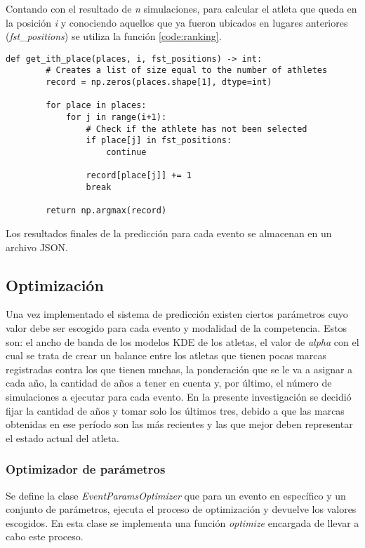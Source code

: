Contando con el resultado de \textit{n} simulaciones, para calcular el atleta que queda en la posición \textit{i} y conociendo aquellos que ya fueron ubicados en lugares anteriores (\textit{fst\_positions}) se utiliza la función \ref{code:ranking}.

\begin{lstlisting}[caption= Función encargada de obtener el atleta que ocupa la posición i del ranking final, label = code:ranking]
    def get_ith_place(places, i, fst_positions) -> int:
        # Creates a list of size equal to the number of athletes   
        record = np.zeros(places.shape[1], dtype=int)

        for place in places:        
            for j in range(i+1):
                # Check if the athlete has not been selected
                if place[j] in fst_positions:
                    continue
                
                record[place[j]] += 1
                break

        return np.argmax(record)
\end{lstlisting}

Los resultados finales de la predicción para cada evento se almacenan en un archivo JSON.

\subsection{Optimización}

Una vez implementado el sistema de predicción existen ciertos parámetros cuyo valor debe ser escogido para cada evento y modalidad de la competencia. Estos son: el ancho de banda de los modelos KDE de los atletas, el valor de \textit{alpha} con el cual se trata de crear un balance entre los atletas que tienen pocas marcas registradas contra los que tienen muchas, la ponderación que se le va a asignar a cada año, la cantidad de años a tener en cuenta y, por último, el número de simulaciones a ejecutar para cada evento. En la presente investigación se decidió fijar la cantidad de años y tomar solo los últimos tres, debido a que las marcas obtenidas en ese período son las más recientes y las que mejor deben representar el estado actual del atleta.

\subsubsection*{Optimizador de parámetros}

Se define la clase \textit{EventParamsOptimizer} que para un evento en específico y un conjunto de parámetros, ejecuta el proceso de optimización y devuelve los valores escogidos. En esta clase se implementa una función \textit{optimize} encargada de llevar a cabo este proceso.

